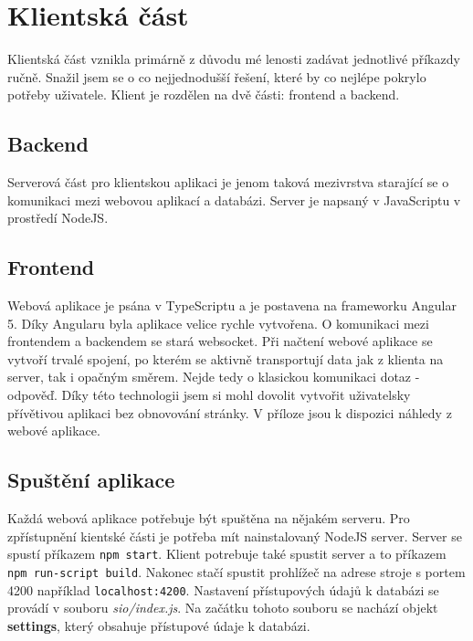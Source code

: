 \documentclass{article}
\begin{document}
\begin{minipage}{\linewidth}

\end{minipage}

\section{Klientská část}
Klientská část vznikla primárně z důvodu mé lenosti zadávat jednotlivé
příkazdy ručně. Snažil jsem se o co nejjednodušší řešení, které by 
co nejlépe pokrylo potřeby uživatele. 
Klient je rozdělen na dvě části: frontend a backend.
\subsection{Backend}
Serverová část pro klientskou aplikaci je jenom taková mezivrstva starající se o komunikaci
mezi webovou aplikací a databázi. Server je napsaný v JavaScriptu v prostředí NodeJS.
\subsection{Frontend}
Webová aplikace je psána v TypeScriptu a je postavena na frameworku Angular 5.
Díky Angularu byla aplikace velice rychle vytvořena.
O komunikaci mezi frontendem a backendem se stará websocket.
Při načtení webové aplikace se vytvoří trvalé spojení, po kterém se aktivně transportují
data jak z klienta na server, tak i opačným směrem. Nejde tedy o klasickou komunikaci
dotaz - odpověď. Díky této technologii jsem si mohl dovolit vytvořit uživatelsky přívětivou
aplikaci bez obnovování stránky.
V příloze jsou k dispozici náhledy z webové aplikace.
\subsection{Spuštění aplikace}
Každá webová aplikace potřebuje být spuštěna na nějakém serveru.
Pro zpřístupnění kientské části je potřeba mít nainstalovaný NodeJS server.
Server se spustí příkazem \lstinline{npm start}.
Klient potrebuje také spustit server a to příkazem \lstinline{npm run-script build}.
Nakonec stačí spustit prohlížeč na adrese stroje s portem 4200 například 
\lstinline{localhost:4200}.
Nastavení přístupových údajů k databázi se provádí v souboru \textit{sio/index.js}.
Na začátku tohoto souboru se nachází objekt \textbf{settings}, který obsahuje přístupové
údaje k databázi.

\newpage
\end{document}
